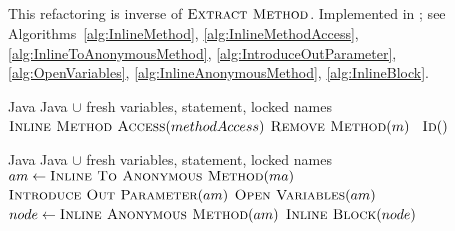 \subsection{}
This refactoring is inverse of $\textsc{Extract Method}$. Implemented in ; 
see Algorithms~\ref{alg:InlineMethod}, \ref{alg:InlineMethodAccess}, \ref{alg:InlineToAnonymousMethod}, %
\ref{alg:IntroduceOutParameter}, %
\ref{alg:OpenVariables}, \ref{alg:InlineAnonymousMethod}, \ref{alg:InlineBlock}.


\begin{algorithm}[p]
\caption{$\refactoring{Inline Method}(m \colon \type{Method})$}
\label{alg:InlineMethod}
\begin{algorithmic}[1]
\REQUIRE Java
\ENSURE Java $\cup$ fresh variables,  statement, locked names
\medskip
    \STATE $\textsc{Inline Method Access}(methodAccess)$
  \ENDFOR
  \STATE $\textsc{Remove Method}(m)$ \orelse\ $\textsc{Id}()$
\end{algorithmic}
\end{algorithm}


\begin{algorithm}[p]
\caption{$\refactoring{Inline Method Access}(ma \colon \type{MethodAccess})$}
\label{alg:InlineMethodAccess}
\begin{algorithmic}[1]
\REQUIRE Java
\ENSURE Java $\cup$ fresh variables,  statement, locked names
\medskip
  \STATE $am \leftarrow \textsc{Inline To Anonymous Method}(ma)$
  \STATE $\textsc{Introduce Out Parameter}(am)$
  \STATE $\textsc{Open Variables}(am)$
  \STATE $node \leftarrow \textsc{Inline Anonymous Method}(am)$
    \STATE $\textsc{Inline Block}(node)$
  \ENDIF
\end{algorithmic}
\end{algorithm}



